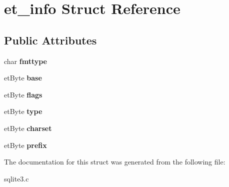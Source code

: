 \hypertarget{structet__info}{\section{et\-\_\-info Struct Reference}
\label{structet__info}
}
\subsection*{Public Attributes}
\begin{DoxyCompactItemize}
\item 
\hypertarget{structet__info_a1740af27f0c9d5840e7dda59a129aa4b}{char {\bfseries fmttype}}\label{structet__info_a1740af27f0c9d5840e7dda59a129aa4b}

\item 
\hypertarget{structet__info_a20f5a4c11c7aa1d9c777805d11965c66}{et\-Byte {\bfseries base}}\label{structet__info_a20f5a4c11c7aa1d9c777805d11965c66}

\item 
\hypertarget{structet__info_a8f11646aaec803f0870683dc3ba2f756}{et\-Byte {\bfseries flags}}\label{structet__info_a8f11646aaec803f0870683dc3ba2f756}

\item 
\hypertarget{structet__info_a148bd1efa49018c9a723701ba5747825}{et\-Byte {\bfseries type}}\label{structet__info_a148bd1efa49018c9a723701ba5747825}

\item 
\hypertarget{structet__info_a77131acb7479b0e6aad61af0901e11c2}{et\-Byte {\bfseries charset}}\label{structet__info_a77131acb7479b0e6aad61af0901e11c2}

\item 
\hypertarget{structet__info_a23cc866bf202c34e49bd49599b051628}{et\-Byte {\bfseries prefix}}\label{structet__info_a23cc866bf202c34e49bd49599b051628}

\end{DoxyCompactItemize}


The documentation for this struct was generated from the following file\-:\begin{DoxyCompactItemize}
\item 
sqlite3.\-c\end{DoxyCompactItemize}
